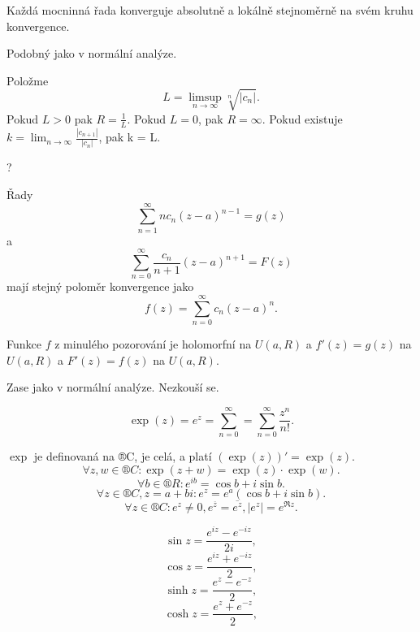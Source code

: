 \documentclass[12pt]{article}					%
\begin{document}
\begin{veta}
	Každá mocninná řada konverguje absolutně a lokálně stejnoměrně na svém kruhu konvergence.

	\begin{dukazin}
		Podobný jako v normální analýze.
	\end{dukazin}
\end{veta}

\begin{veta}
	Položme
	$$ L = \limsup_{n \rightarrow ∞} \sqrt[n]{|c_n|}. $$
	Pokud $L > 0$ pak $R = \frac{1}{L}$. Pokud $L = 0$, pak $R = ∞$. Pokud existuje $k = \lim_{n \rightarrow ∞} \frac{|c_{n+1}|}{|c_n|}$, pak k = L.

	\begin{dukazin}
		?
	\end{dukazin}
\end{veta}

\begin{pozorovani}
	Řady
	$$ \sum_{n=1}^∞ n c_n (z - a)^{n-1} = g(z) $$
	a
	$$ \sum_{n=0}^∞ \frac{c_n}{n+1} (z - a)^{n+1} = F(z) $$
	mají stejný poloměr konvergence jako
	$$ f(z) = \sum_{n=0}^∞ c_n (z - a)^n. $$
\end{pozorovani}

\begin{veta}
	Funkce $f$ z minulého pozorování je holomorfní na $U(a, R)$ a $f'(z) = g(z)$ na $U(a, R)$ a $F'(z) = f(z)$ na $U(a, R)$.

	\begin{dukazin}
		Zase jako v normální analýze. Nezkouší se.
	\end{dukazin}
\end{veta}

\begin{definice}
	$$ \exp(z) = e^z = \sum_{n = 0}^∞ = \sum_{n=0}^∞ \frac{z^n}{n!}. $$
	
	\begin{poznamkain}[Vlastnosti]
		$\exp$ je definovaná na ®C, je celá, a platí $(\exp(z))' = \exp(z)$.
		$$ \forall z, w \in ®C: \exp(z + w) = \exp(z)·\exp(w). $$
		$$ \forall b \in ®R: e^{ib} = \cos b + i\sin b. $$
		$$ \forall z \in ®C, z = a + bi: e^z = e^a(\cos b + i \sin b). $$
		$$ \forall z \in ®C: e^z ≠ 0, e^{\overline{z}} = \overline{e^z}, |e^z| = e^{\Re z}. $$
	\end{poznamkain}
\end{definice}

\begin{definice}
	$$ \sin z = \frac{e^{iz} - e^{-iz}}{2i}, $$
	$$ \cos z = \frac{e^{iz} + e^{-iz}}{2}, $$
	$$ \sinh z = \frac{e^{z} - e^{-z}}{2}, $$
	$$ \cosh z = \frac{e^{z} + e^{-z}}{2}, $$
\end{definice}
\end{document}
